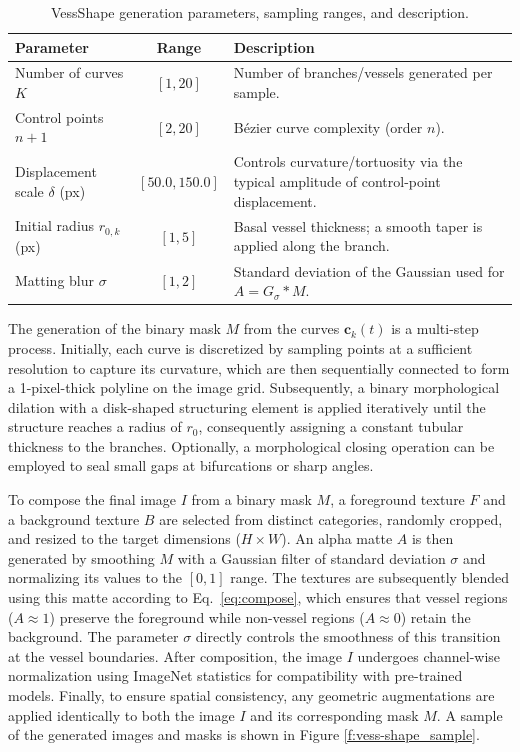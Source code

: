 \documentclass[%
reprint,
nofootinbib,
 amsmath,amssymb,
aps,
superscriptaddress,
showkeys,
longbibliography
]{revtex4-1}
\begin{document}
\begin{table}[t]
\caption{VessShape generation parameters, sampling ranges, and description.}
\label{tab:vessshape_params}
\centering
\begin{tabularx}{\textwidth}{l c X}
\hline
    \textbf{Parameter} & \textbf{Range} & \textbf{Description} \\
\hline
Number of curves $K$ & $[1,20]$ & Number of branches/vessels generated per sample. \\
Control points $n{+}1$ & $[2,20]$ & Bézier curve complexity (order $n$). \\
Displacement scale $\delta$ (px) & $[50.0,150.0]$ & Controls curvature/tortuosity via the typical amplitude of control-point displacement. \\
Initial radius $r_{0,k}$ (px) & $[1,5]$ & Basal vessel thickness; a smooth taper is applied along the branch. \\
Matting blur $\sigma$ & $[1,2]$ & Standard deviation of the Gaussian used for $A = G_{\sigma} * M$. \\

\hline
\end{tabularx}
\end{table}


The generation of the binary mask $M$ from the curves $\mathbf{c}_k(t)$ is a multi-step process. Initially, each curve is discretized by sampling points at a sufficient resolution to capture its curvature, which are then sequentially connected to form a 1-pixel-thick polyline on the image grid. Subsequently, a binary morphological dilation with a disk-shaped structuring element is applied iteratively until the structure reaches a radius of $r_0$, consequently assigning a constant tubular thickness to the branches. Optionally, a morphological closing operation can be employed to seal small gaps at bifurcations or sharp angles.

To compose the final image $I$ from a binary mask $M$, a foreground texture $F$ and a background texture $B$ are selected from distinct categories, randomly cropped, and resized to the target dimensions ($H \times W$). An alpha matte $A$ is then generated by smoothing $M$ with a Gaussian filter of standard deviation $\sigma$ and normalizing its values to the $[0, 1]$ range. The textures are subsequently blended using this matte according to Eq.~\ref{eq:compose}, which ensures that vessel regions ($A \approx 1$) preserve the foreground while non-vessel regions ($A \approx 0$) retain the background. The parameter $\sigma$ directly controls the smoothness of this transition at the vessel boundaries. After composition, the image $I$ undergoes channel-wise normalization using ImageNet statistics for compatibility with pre-trained models. Finally, to ensure spatial consistency, any geometric augmentations are applied identically to both the image $I$ and its corresponding mask $M$. A sample of the generated images and masks is shown in Figure \ref{f:vess-shape_sample}.
\end{document}
